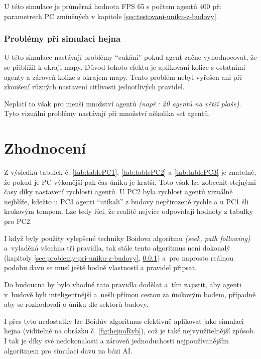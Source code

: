 \documentclass[czech,public,dept460,male,cpdeclaration]{diploma}
\begin{document}

U této simulace je průměrná hodnota FPS 65 s počtem agentů 400 při parametrech PC zmíněných v kapitole \ref{sec:testovani-uniku-z-budovy}.

\subsubsection{Problémy při simulaci hejna}\label{sec:problemy-pri-simulace-hejna}
U této simulace nastávají problémy ``cukání'' pokud agent začne vyhodnocovat, že se přiblížil k okraji mapy. Důvod tohoto efektu je aplikování kolize s ostatními agenty a zároveň kolize s okrajem mapy. Tento problém nebyl vyřešen ani při zkoušení různých nastavení citlivosti jednotlivých pravidel.

Neplatí to však pro menší množství agentů \textit{(např.: 20 agentů na větší ploše)}. Tyto vizuální problémy nastávají při množství několika set agentů.

\newpage
\section{Zhodnocení}

Z výsledků tabulek č. \ref{tab:tablePC1}, \ref{tab:tablePC2} a \ref{tab:tablePC3} je znatelné, že pokud je PC výkonější pak čas úniku je kratší. Toto však lze zobecnit stejnými časy díky nastavení rychlosti agentů. U PC2 byla rychlost agentů vizuálně nejblíže, kdežto u PC3 agenti ``utíkali'' z budovy nepřirozeně rychle a u PC1 šli krokovým tempem. Lze tedy říci, že realitě nejvíce odpovídají hodnoty z tabulky pro PC2.

I když byly použity vylepšené techniky Boidova algoritmu \textit{(seek, path following)} a~vyladěná všechna tři pravidla, tak stále tento algoritmus není dokonalý (kapitoly \ref{sec:problemy-pri-uniku-z-budovy}, \ref{sec:problemy-pri-simulace-hejna}) a~pro naprosto reálnou podobu davu se musí ještě hodně vlastností a pravidel připsat.

Do budoucna by bylo vhodné tato pravidla dodělat a~tím zajistit, aby agenti v~budově byli inteligentnější a~nešli přímou cestou za únikovým bodem, případně aby se rozhodovali o úniku dle sektorů budovy.

I přes tyto nedostatky lze Boidův algoritmus efektivně aplikovat jako simulaci hejna (viditelné na obrázku č. \ref{fig:hejnoRyb}), což je také nejvyužitelnější způsob. I tak je díky své nedokonalosti a zároveň jednoduchosti nejpoužívanějším algoritmem pro simulaci davu na bázi AI.
\end{document}
